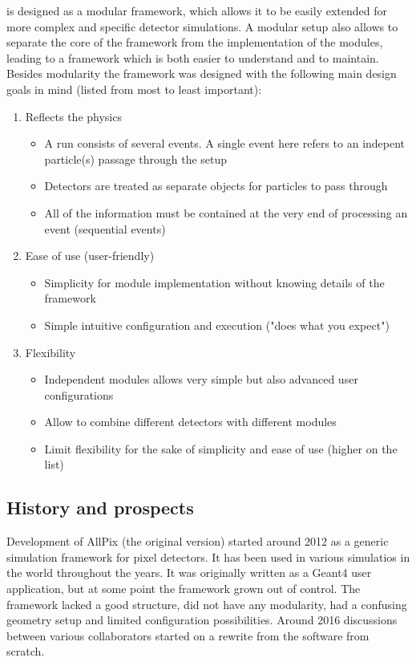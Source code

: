 \apsq is designed as a modular framework, which allows it to be easily extended for more complex and specific detector simulations. A modular setup also allows to separate the core of the framework from the implementation of the modules, leading to a framework which is both easier to understand and to maintain. Besides modularity the \apsq framework was designed with the following main design goals in mind (listed from most to least important):
\begin{enumerate}
    \item Reflects the physics
    \begin{itemize}
        \item A run consists of several events. A single event here refers to an indepent particle(s) passage through the setup
        \item Detectors are treated as separate objects for particles to pass through
        \item All of the information must be contained at the very end of processing an event (sequential events)
    \end{itemize}
    \item Ease of use (user-friendly)
    \begin{itemize}
        \item Simplicity for module implementation without knowing details of the framework
        \item Simple intuitive configuration and execution ("does what you expect")
    \end{itemize}
    \item Flexibility
    \begin{itemize}
        \item Independent modules allows very simple but also advanced user configurations
        \item Allow to combine different detectors with different modules
        \item Limit flexibility for the sake of simplicity and ease of use (higher on the list)
    \end{itemize}
\end{enumerate}

\subsection{History and prospects}
Development of AllPix (the original version) started around 2012  as a generic simulation framework for pixel detectors. It has been used in various simulatios in the world throughout the years. It was originally written as a Geant4 user application, but at some point the framework grown out of control. The framework lacked a good structure, did not have any modularity, had a confusing geometry setup and limited configuration possibilities. Around 2016 discussions between various collaborators started on a rewrite from the software from scratch. 

